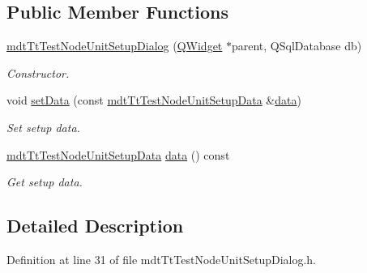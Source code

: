 \subsection*{Public Member Functions}
\begin{DoxyCompactItemize}
\item 
\hyperlink{classmdt_tt_test_node_unit_setup_dialog_a3203a81f1f6d6cbea4f36e0c67471a4c}{mdt\-Tt\-Test\-Node\-Unit\-Setup\-Dialog} (\hyperlink{class_q_widget}{Q\-Widget} $\ast$parent, Q\-Sql\-Database db)
\begin{DoxyCompactList}\small\item\em Constructor. \end{DoxyCompactList}\item 
void \hyperlink{classmdt_tt_test_node_unit_setup_dialog_a136ff71aa96193408318c285ed674017}{set\-Data} (const \hyperlink{classmdt_tt_test_node_unit_setup_data}{mdt\-Tt\-Test\-Node\-Unit\-Setup\-Data} \&\hyperlink{classmdt_tt_test_node_unit_setup_dialog_a9533f72e17e88d434320c298ecd99f11}{data})
\begin{DoxyCompactList}\small\item\em Set setup data. \end{DoxyCompactList}\item 
\hyperlink{classmdt_tt_test_node_unit_setup_data}{mdt\-Tt\-Test\-Node\-Unit\-Setup\-Data} \hyperlink{classmdt_tt_test_node_unit_setup_dialog_a9533f72e17e88d434320c298ecd99f11}{data} () const 
\begin{DoxyCompactList}\small\item\em Get setup data. \end{DoxyCompactList}\end{DoxyCompactItemize}


\subsection{Detailed Description}


Definition at line 31 of file mdt\-Tt\-Test\-Node\-Unit\-Setup\-Dialog.\-h.



